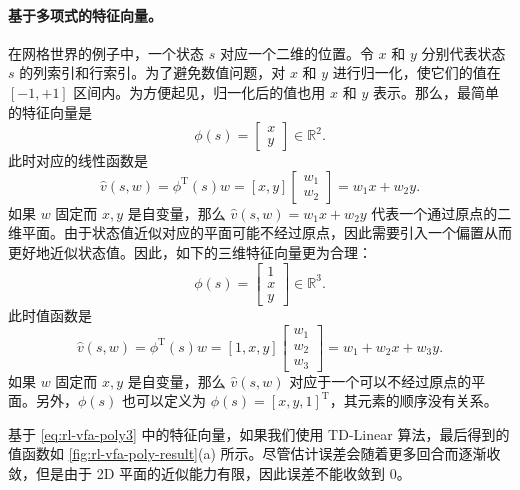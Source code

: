 \paragraph{基于多项式的特征向量。}在网格世界的例子中，一个状态 $s$ 对应一个二维的位置。令 $x$ 和 $y$ 分别代表状态 $s$ 的列索引和行索引。为了避免数值问题，对 $x$ 和 $y$ 进行归一化，使它们的值在 $[-1,+1]$ 区间内。为方便起见，归一化后的值也用 $x$ 和 $y$ 表示。那么，最简单的特征向量是
\begin{equation*}
\phi(s) = \left[\begin{array}{l} x \\ y \end{array}\right] \in \mathbb{R}^{2}.
\end{equation*}
此时对应的线性函数是
\begin{equation*}
\hat{v}(s, w) = \phi^{\mathrm{T}}(s) w = [x, y] \left[\begin{array}{l} w_{1} \\ w_{2} \end{array}\right] = w_{1} x + w_{2} y.
\end{equation*}
如果 $w$ 固定而 $x, y$ 是自变量，那么 $\hat{v}(s, w) = w_{1}x + w_{2}y$ 代表一个通过原点的二维平面。由于状态值近似对应的平面可能不经过原点，因此需要引入一个偏置从而更好地近似状态值。因此，如下的三维特征向量更为合理：
\begin{equation}
\phi(s) = \left[\begin{array}{l} 1 \\ x \\ y \end{array}\right] \in \mathbb{R}^{3}.
\label{eq:rl-vfa-poly3}
\end{equation}
此时值函数是
\begin{equation*}
\hat{v}(s, w) = \phi^{\mathrm{T}}(s) w = [1, x, y] \left[\begin{array}{l} w_{1} \\ w_{2} \\ w_{3} \end{array}\right] = w_{1} + w_{2} x + w_{3} y.
\end{equation*}
如果 $w$ 固定而 $x, y$ 是自变量，那么 $\hat{v}(s, w)$ 对应于一个可以不经过原点的平面。另外，$\phi(s)$ 也可以定义为 $\phi(s) = [x, y, 1]^{\mathrm{T}}$，其元素的顺序没有关系。

基于 \cref{eq:rl-vfa-poly3} 中的特征向量，如果我们使用 TD-Linear 算法，最后得到的值函数如 \cref{fig:rl-vfa-poly-result}(a) 所示。尽管估计误差会随着更多回合而逐渐收敛，但是由于 2D 平面的近似能力有限，因此误差不能收敛到 $0$。

